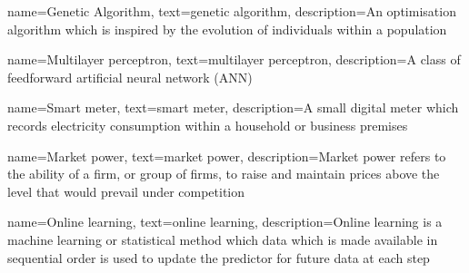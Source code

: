{
	name=Genetic Algorithm,
	text=genetic algorithm,
	description={An optimisation algorithm which is inspired by the evolution of individuals within a population}
}



{
	name=Multilayer perceptron,
	text=multilayer perceptron,
	description={A class of feedforward artificial neural network (ANN)}
}


{
	name=Smart meter,
	text=smart meter,
	description={A small digital meter which records electricity consumption within a household or business premises}
}

{
	name=Market power,
	text=market power,
	description={Market power refers to the ability of a firm, or group of firms, to raise and maintain prices above the level that would prevail under competition}
}


{
	name=Online learning,
	text=online learning,
	description={Online learning is a machine learning or statistical method which data which is made available in sequential order is used to update the predictor for future data at each step}
}

















